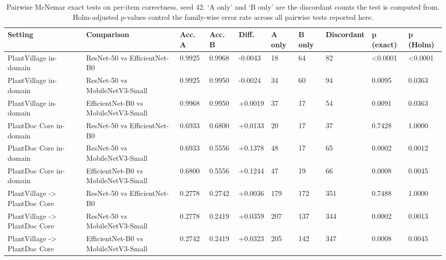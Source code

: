 \begin{table}[htbp]
\caption{Pairwise McNemar exact tests on per-item correctness, seed 42. `A only' and `B only' are the discordant counts the test is computed from. Holm-adjusted p-values control the family-wise error rate across all pairwise tests reported here.}
\label{tab:mcnemar}
\scriptsize
\centering
\setlength{\tabcolsep}{2pt}
\begin{tabular}{llllllllll}
\toprule
Setting & Comparison & Acc. A & Acc. B & Diff. & A only & B only & Discordant & p (exact) & p (Holm) \\
\midrule
PlantVillage in-domain & ResNet-50 vs EfficientNet-B0 & 0.9925 & 0.9968 & -0.0043 & 18 & 64 & 82 & <0.0001 & <0.0001 \\
PlantVillage in-domain & ResNet-50 vs MobileNetV3-Small & 0.9925 & 0.9950 & -0.0024 & 34 & 60 & 94 & 0.0095 & 0.0363 \\
PlantVillage in-domain & EfficientNet-B0 vs MobileNetV3-Small & 0.9968 & 0.9950 & +0.0019 & 37 & 17 & 54 & 0.0091 & 0.0363 \\
PlantDoc Core in-domain & ResNet-50 vs EfficientNet-B0 & 0.6933 & 0.6800 & +0.0133 & 20 & 17 & 37 & 0.7428 & 1.0000 \\
PlantDoc Core in-domain & ResNet-50 vs MobileNetV3-Small & 0.6933 & 0.5556 & +0.1378 & 48 & 17 & 65 & 0.0002 & 0.0012 \\
PlantDoc Core in-domain & EfficientNet-B0 vs MobileNetV3-Small & 0.6800 & 0.5556 & +0.1244 & 47 & 19 & 66 & 0.0008 & 0.0045 \\
PlantVillage -> PlantDoc Core & ResNet-50 vs EfficientNet-B0 & 0.2778 & 0.2742 & +0.0036 & 179 & 172 & 351 & 0.7488 & 1.0000 \\
PlantVillage -> PlantDoc Core & ResNet-50 vs MobileNetV3-Small & 0.2778 & 0.2419 & +0.0359 & 207 & 137 & 344 & 0.0002 & 0.0013 \\
PlantVillage -> PlantDoc Core & EfficientNet-B0 vs MobileNetV3-Small & 0.2742 & 0.2419 & +0.0323 & 205 & 142 & 347 & 0.0008 & 0.0045 \\
\bottomrule
\end{tabular}
\end{table}
